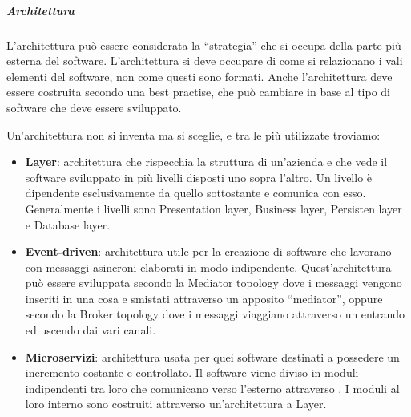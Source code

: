         \subparagraph{Architettura} \label{PP:progettazione:architettura}
        L'architettura può essere considerata la ``strategia'' che si occupa della parte più esterna del software. L'architettura si deve occupare di come si relazionano i vali elementi del software, non come questi sono formati. Anche l'architettura deve essere costruita secondo una best practise, che può cambiare in base al tipo di software che deve essere sviluppato. \par
        Un'architettura non si inventa ma si sceglie, e tra le più utilizzate troviamo:
        \begin{itemize}
            \item \textbf{Layer}: architettura che rispecchia la struttura di un'azienda e che vede il software sviluppato in più livelli disposti uno sopra l'altro. Un livello è dipendente esclusivamente da quello sottostante e comunica con esso. Generalmente i livelli sono Presentation layer, Business layer, Persisten layer e Database layer.
            \item \textbf{Event-driven}: architettura utile per la creazione di software che lavorano con messaggi asincroni elaborati in modo indipendente. Quest'architettura può essere sviluppata secondo la Mediator topology dove i messaggi vengono inseriti in una cosa e smistati attraverso un apposito ``mediator'', oppure secondo la Broker topology dove i messaggi viaggiano attraverso un  entrando ed uscendo dai vari canali.
            \item \textbf{Microservizi}: architettura usata per quei software destinati a possedere un incremento costante e controllato. Il software viene diviso in moduli indipendenti tra loro che comunicano verso l'esterno attraverso . I moduli al loro interno sono costruiti attraverso un'architettura a Layer.
        \end{itemize}

